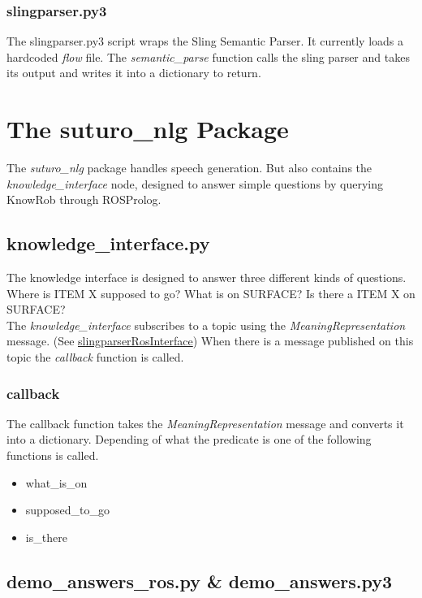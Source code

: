 \documentclass[main.tex]{subfiles}
\begin{document}
        \subsubsection{slingparser.py3}
            The slingparser.py3 script wraps the Sling Semantic Parser. It currently loads a hardcoded \textit{flow} file.
            The \textit{semantic\_parse} function calls the sling parser and takes its output and writes it into a dictionary to return.
    
\section{The suturo\_nlg Package}
    The \textit{suturo\_nlg} package handles speech generation. But also contains the \textit{knowledge\_interface} node, designed to answer simple questions by querying KnowRob through ROSProlog.
    \subsection{knowledge\_interface.py}
        The knowledge interface is designed to answer three different kinds of questions. Where is ITEM X supposed to go? What is on SURFACE? Is there a ITEM X on SURFACE?\\
        The \textit{knowledge\_interface} subscribes to a topic using the \textit{MeaningRepresentation} message. (See \hyperref[slingparserros]{slingparserRosInterface}) When there is a message published on this topic the \textit{callback} function is called.
        \subsubsection{callback}
            The callback function takes the \textit{MeaningRepresentation} message and converts it into a dictionary.
            Depending of what the predicate is one of the following functions is called.
            \begin{itemize}
                \item what\_is\_on
                \item supposed\_to\_go
                \item is\_there             
            \end{itemize}
    \subsection{demo\_answers\_ros.py \& demo\_answers.py3}
    
\end{document}
